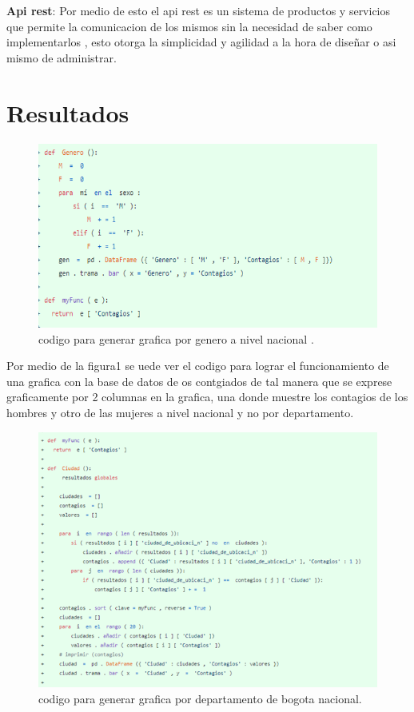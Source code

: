 \documentclass[conference,compsoc,onecolumn]{IEEEtran}
\begin{document}
\textbf{Api rest}:  Por medio de esto el api rest es un sistema de productos y servicios que permite la comunicacion de los mismos sin la necesidad de saber como implementarlos , esto otorga la simplicidad y agilidad a la hora de diseñar o asi mismo de administrar.\\

\section{Resultados }

\begin{figure}[h!]
    \centering
    \includegraphics[scale=0.4]{images/i1.png}
    \caption{codigo para generar grafica por genero a nivel nacional .}
    \label{fig:fig1}
\end{figure}

Por medio de la figura1 se uede ver el codigo para lograr el funcionamiento de una grafica con la base de datos de os contgiados de tal manera que se exprese graficamente por 2 columnas en la grafica, una donde muestre los contagios de los hombres y otro de las mujeres a nivel nacional y no por departamento.\\


\begin{figure}[h!]
    \centering
    \includegraphics[scale=0.4]{images/i2.png}
    \caption{codigo para generar grafica por departamento de bogota nacional.}
    \label{fig:fig1}
\end{figure}
\end{document}
